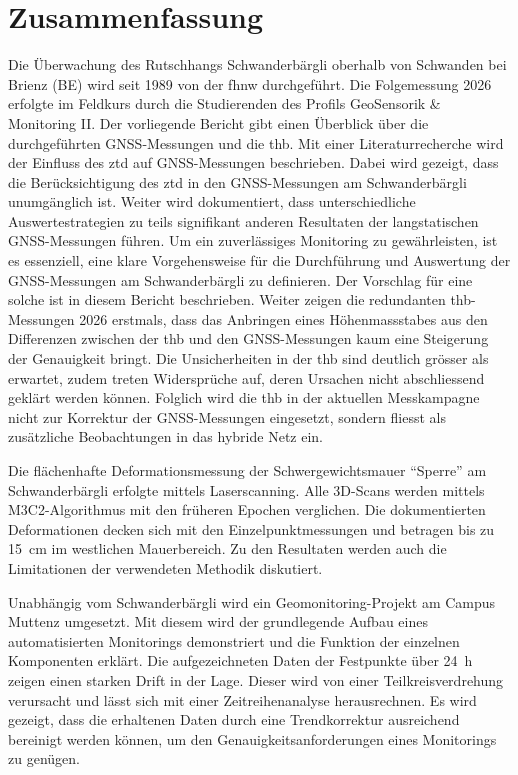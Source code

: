 \clearpage
\section*{Zusammenfassung}

Die Überwachung des Rutschhangs Schwanderbärgli oberhalb von Schwanden bei Brienz (BE) wird seit 1989 von der \gls{fhnw} 
durchgeführt. Die Folgemessung 2026 erfolgte im Feldkurs durch die Studierenden des Profils GeoSensorik \& Monitoring II. 
Der vorliegende Bericht 
gibt einen Überblick über die durchgeführten GNSS-Messungen und die \gls{thb}. Mit einer Literaturrecherche wird der Einfluss 
des \gls{ztd} auf GNSS-Messungen beschrieben. Dabei wird gezeigt, dass die Berücksichtigung des \gls{ztd} in den GNSS-Messungen 
am Schwanderbärgli unumgänglich ist. Weiter wird dokumentiert, dass unterschiedliche Auswertestrategien zu teils signifikant 
anderen Resultaten der langstatischen GNSS-Messungen führen. Um ein zuverlässiges Monitoring zu gewährleisten, ist es essenziell, 
eine klare Vorgehensweise für die Durchführung und Auswertung der GNSS-Messungen am Schwanderbärgli zu definieren. 
Der Vorschlag für eine solche ist in diesem Bericht beschrieben. 
Weiter zeigen die redundanten \acrshort{thb}-Messungen 2026 erstmals, dass das Anbringen eines Höhenmassstabes aus den Differenzen 
zwischen der \gls{thb} und den GNSS-Messungen kaum eine Steigerung der Genauigkeit bringt. Die Unsicherheiten in der \gls{thb} 
sind deutlich grösser als erwartet, zudem treten Widersprüche auf, deren Ursachen nicht abschliessend geklärt werden können. 
Folglich wird die \gls{thb} in der aktuellen Messkampagne nicht zur Korrektur der GNSS-Messungen eingesetzt, sondern fliesst 
als zusätzliche Beobachtungen in das hybride Netz ein.

Die flächenhafte Deformationsmessung der Schwergewichtsmauer ``Sperre'' am Schwanderbärgli erfolgte mittels Laserscanning. Alle 
3D-Scans werden mittels M3C2-Algorithmus \parencite{lagueAccurate3DComparison2013} mit den früheren Epochen verglichen. 
Die dokumentierten Deformationen decken sich mit den Einzelpunktmessungen und betragen bis zu 15~cm im westlichen Mauerbereich. 
Zu den Resultaten werden auch die Limitationen der verwendeten Methodik diskutiert. 

Unabhängig vom Schwanderbärgli wird ein Geomonitoring-Projekt am Campus Muttenz umgesetzt. Mit diesem wird der grundlegende 
Aufbau eines automatisierten Monitorings demonstriert und die Funktion der einzelnen Komponenten erklärt. Die aufgezeichneten 
Daten der Festpunkte über 24~h zeigen einen starken Drift in der Lage. Dieser wird von einer Teilkreisverdrehung verursacht 
und lässt sich mit einer Zeitreihenanalyse herausrechnen. Es wird gezeigt, dass die erhaltenen Daten durch eine Trendkorrektur 
ausreichend bereinigt werden können, um den Genauigkeitsanforderungen eines Monitorings zu genügen. 



